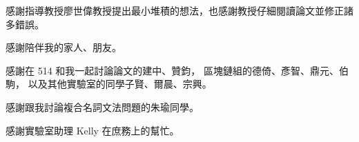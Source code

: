 \begin{acknowledgementszh}
感謝指導教授廖世偉教授提出最小堆積的想法，也感謝教授仔細閱讀論文並修正諸多錯誤。

感謝陪伴我的家人、朋友。

感謝在 514 和我一起討論論文的建中、贊鈞，
區塊鏈組的德倚、彥智、鼎元、伯駒，
以及其他實驗室的同學子賢、爾晨、宗興。

感謝跟我討論複合名詞文法問題的朱瑜同學。

感謝實驗室助理 Kelly 在庶務上的幫忙。

\end{acknowledgementszh}
